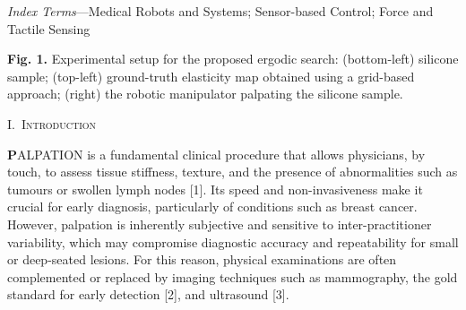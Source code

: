 \documentclass[11pt]{article}
\begin{document}
\vspace{0.4em}

\noindent
\textit{Index Terms}---Medical Robots and Systems; Sensor-based
Control; Force and Tactile Sensing

\vspace{1em}

\begin{center}
\end{center}

\vspace{0.3em}

\begin{center}
\textbf{Fig. 1.} Experimental setup for the proposed ergodic search:
(bottom-left) silicone sample; (top-left) ground-truth elasticity map
obtained using a grid-based approach; (right) the robotic manipulator
palpating the silicone sample.
\end{center}

\vspace{1.2em}

\begin{center}
\textsc{I.\ Introduction}
\end{center}

\noindent
{\large\bfseries P}ALPATION is a fundamental clinical procedure that
allows physicians, by touch, to assess tissue stiffness, texture, and
the presence of abnormalities such as tumours or swollen lymph nodes
[1]. Its speed and non-invasiveness make it crucial for early
diagnosis, particularly of conditions such as breast cancer. However,
palpation is inherently subjective and sensitive to inter-practitioner
variability, which may compromise diagnostic accuracy and
repeatability for small or deep-seated lesions. For this reason,
physical examinations are often complemented or replaced by imaging
techniques such as mammography, the gold standard for early detection
[2], and ultrasound [3].
\end{document}
